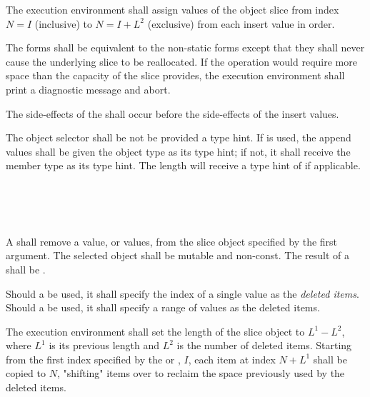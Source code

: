 \specsubsubitem
The execution environment shall assign values of the object slice from index
$N = I$ (inclusive) to $N = I+L^2$ (exclusive) from each insert value in order.

\specsubsubitem
The  forms shall be equivalent to the non-static forms except
that they shall never cause the underlying slice to be reallocated. If the
operation would require more space than the capacity of the slice provides, the
execution environment shall print a diagnostic message and abort.

\specsubsubitem
The side-effects of the  shall occur before
the side-effects of the insert values.

\specsubsubitem
The object selector shall be not be provided a type hint. If  is
used, the append values shall be given the object type as its type hint; if
not, it shall receive the member type as its type hint. The length will receive
a type hint of  if applicable.


\begin{grammar}
 \\
	  \terminal{(}  \terminal{)} \\
	  \terminal{(}  \terminal{)} \\
\end{grammar}

\specsubsubitem
A  shall remove a value, or values, from the
slice object specified by the first argument. The selected object shall be
mutable and non-const. The result of a  shall be
.

\specsubsubitem
Should a  be used, it shall specify the index
of a single value as the \textit{deleted items}. Should a
 be used, it shall specify a range of values as
the deleted items.

\specsubsubitem
The execution environment shall set the length of the slice object to $L^1-L^2$,
where $L^1$ is its previous length and $L^2$ is the number of deleted items.
Starting from the first index specified by the
 or , $I$,
each item at index $N+L^1$ shall be copied to $N$, "shifting" items over to
reclaim the space previously used by the deleted items.

